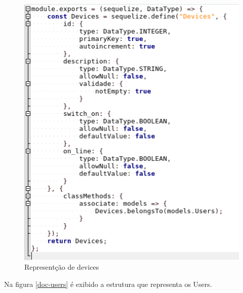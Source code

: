 \begin{figure}[H]
\caption{\label{doc-devices} Representção de devices}
\includegraphics[scale=0.5]{img/devices-doc.png}
\end{figure}

Na figura \ref{doc-users} é exibido a estrutura que representa os Users.

